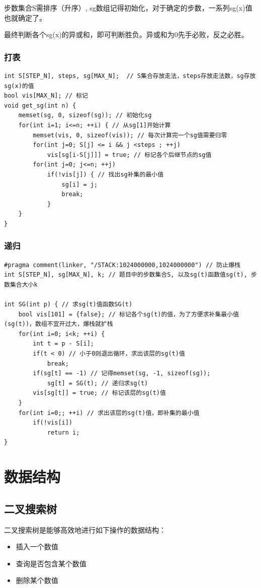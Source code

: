 \documentclass[a4paper]{ctexrep}
\begin{document}
步数集合S需排序（升序）, sg数组记得初始化，对于确定的步数，一系列sg(x)值也就确定了。

最终判断各个sg(x)的异或和，即可判断胜负。异或和为0先手必败，反之必胜。

\subsection{打表}
\begin{lstlisting}
int S[STEP_N], steps, sg[MAX_N];  // S集合存放走法，steps存放走法数，sg存放sg(x)的值
bool vis[MAX_N]; // 标记
void get_sg(int n) {
	memset(sg, 0, sizeof(sg)); // 初始化sg
	for(int i=1; i<=n; ++i) { // 从sg[1]开始计算
		memset(vis, 0, sizeof(vis)); // 每次计算完一个sg值需要归零
		for(int j=0; S[j] <= i && j <steps ; ++j)
			vis[sg[i-S[j]]] = true; // 标记各个后继节点的sg值
		for(int j=0; j<=n; ++j)
			if(!vis[j]) { // 找出sg补集的最小值
				sg[i] = j;
				break;
			}
	}
}
\end{lstlisting}
\subsection{递归}
\begin{lstlisting}
#pragma comment(linker, "/STACK:1024000000,1024000000") // 防止爆栈
int S[STEP_N], sg[MAX_N], k; // 题目中的步数集合S, 以及sg(t)函数值sg(t), 步数集合大小k

int SG(int p) { // 求sg(t)值函数SG(t)
	bool vis[101] = {false}; // 标记各个sg(t)的值，为了方便求补集最小值(sg(t))，数组不宜开过大，爆栈就扩栈
	for(int i=0; i<k; ++i) {
		int t = p - S[i];
		if(t < 0) // 小于0则退出循环，求出该层的sg(t)值
			break;
		if(sg[t] == -1) // 记得memset(sg, -1, sizeof(sg));
			sg[t] = SG(t); // 递归求sg(t)
		vis[sg[t]] = true; // 标记该层的sg(t)值
	}
	for(int i=0;; ++i) // 求出该层的sg(t)值，即补集的最小值
		if(!vis[i])
			return i;
}
\end{lstlisting}



\chapter{数据结构}
\section{二叉搜索树}
二叉搜索树是能够高效地进行如下操作的数据结构：
\begin{itemize}
		\item 插入一个数值
		\item 查询是否包含某个数值
		\item 删除某个数值
\end{itemize}
\end{document}
